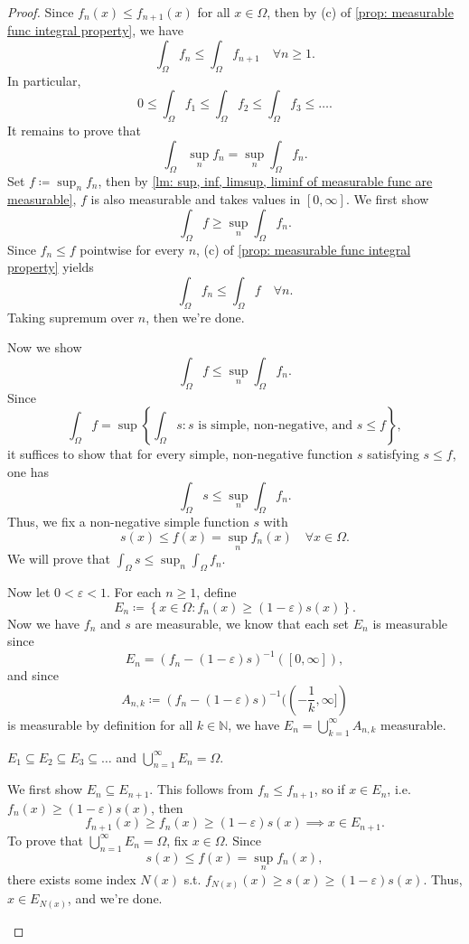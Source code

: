 \begin{proof}
    Since \(f_n(x) \le f_{n+1}(x)\) for all \(x \in \Omega\), then by (c) of \autoref{prop: measurable func integral property}, we have 
    \[
        \int _\Omega f_n \le \int _\Omega f_{n+1} \quad \forall n \ge 1.
    \]
    In particular,
    \[
        0 \le \int _\Omega f_1 \le \int _\Omega f_2 \le \int _\Omega f_3 \le \dots .
    \]  
    It remains to prove that 
    \[
        \int _\Omega \sup _n f_n = \sup _n \int _\Omega f_n.
    \]
    Set \(f \coloneqq \sup _n f_n\), then by \autoref{lm: sup, inf, limsup, liminf of measurable func are measurable}, \(f\) is also measurable and takes values in \([0, \infty]\). We first show 
    \[
        \int _\Omega f \ge \sup _n \int _\Omega f_n.
    \]    
    Since \(f_n \le f\) pointwise for every \(n\), (c) of \autoref{prop: measurable func integral property} yields 
    \[
        \int _\Omega f_n \le \int _\Omega f \quad \forall n.
    \]   
    Taking supremum over \(n\), then we're done.

    Now we show 
    \[
        \int _\Omega f \le \sup _n \int _\Omega f_n.
    \] 
    Since 
    \[
        \int _\Omega f = \sup \left\{ \int _\Omega s: s \text{ is simple, non-negative, and } s \le f  \right\}, 
    \]
    it suffices to show that for every simple, non-negative function \(s\) satisfying \(s \le f\), one has 
    \[
        \int _\Omega s \le \sup _n \int _\Omega f_n.
    \]  
    Thus, we fix a non-negative simple function \(s\) with
    \[
        s(x) \le f(x) = \sup _n f_n(x) \quad \forall x \in \Omega.
    \] 
    We will prove that \(\int _\Omega s \le \sup _n \int _\Omega f_n\). 

    Now let \(0 < \varepsilon < 1\). For each \(n \ge 1\), define 
    \[
        E_n \coloneqq \left\{ x \in \Omega : f_n(x) \ge (1 - \varepsilon) s(x) \right\}. 
    \]   
    Now we have \(f_n\) and \(s\) are measurable, we know that each set \(E_n\) is measurable since
    \[
        E_n = (f_n - (1- \varepsilon ) s)^{-1} ([0, \infty]),
    \]    
    and since 
    \[
        A_{n, k} \coloneqq (f_n - (1- \varepsilon ) s)^{-1} ((-\frac{1}{k}, \infty]) 
    \]
    is measurable by definition for all \(k \in \mathbb{N}\), we have \(E_n = \bigcup_{k=1}^{\infty} A_{n, k} \) measurable. 

    \begin{claim}
        \(E_1 \subseteq E_2 \subseteq E_3 \subseteq \dots \) and \(\bigcup_{n=1}^{\infty} E_n = \Omega \).   
    \end{claim}
    \begin{explanation}
        We first show \(E_n \subseteq E_{n+1}\). This follows from \(f_n \le f_{n+1}\), so if \(x \in E_n\), i.e. \(f_n(x) \ge (1 - \varepsilon) s(x)\), then 
        \[
            f_{n+1}(x) \ge f_n(x) \ge (1 - \varepsilon) s(x) \implies x \in E_{n+1}.
        \]   
        To prove that \(\bigcup_{n=1}^{\infty} E_n = \Omega \), fix \(x \in \Omega\). Since 
        \[
            s(x) \le f(x) = \sup _n f_n(x),
        \]  
        there exists some index \(N(x)\) s.t. \(f_{N(x)}(x) \ge s(x) \ge (1 - \varepsilon)s(x)\). Thus, \(x \in E_{N(x)}\), and we're done.   
    \end{explanation}


\end{proof}
